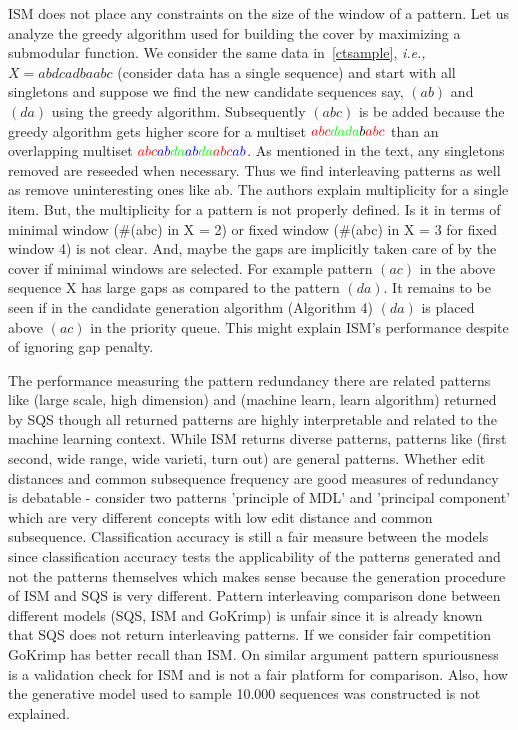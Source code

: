 \documentclass[10pt]{article}
\begin{document}
\par ISM does not place any constraints on the size of the window of a pattern. Let us analyze the greedy algorithm used for building the cover by maximizing a submodular function. We consider the same data in~\ref{ctsample}, \emph{i.e.,} $X=abdcadbaabc$ (consider data has a single sequence) and start with all singletons and suppose we find the new candidate sequences say, {\color{blue}$(ab)$} and {\color{green}$(da)$} using the greedy algorithm. Subsequently {\color{red}$(abc)$} is be added because the greedy algorithm gets higher score for a multiset ${\color{red}abc}{\color{green}da}{\color{green}da}b{\color{red}abc}$ than an overlapping multiset ${\color{red}abc}{\color{blue}ab}{\color{green}da}{\color{blue}ab}{\color{green}da}{\color{red}abc}{\color{blue}ab}$. As mentioned in the text, any singletons removed are reseeded when necessary. Thus we find interleaving patterns as well as remove uninteresting ones like  {\color{blue}ab}. The authors explain multiplicity for a single item. But, the multiplicity for a pattern is not properly defined. Is it in terms of minimal window (\#(abc) in X = 2) or fixed window (\#(abc) in X = 3 for fixed window 4) is not clear. And, maybe the gaps are implicitly taken care of by the cover if minimal windows are selected. For example pattern $(ac)$ in the above sequence X has large gaps as compared to the pattern $(da)$. It remains to be seen if in the candidate generation algorithm (Algorithm 4) $(da)$ is placed above $(ac)$ in the priority queue. This might explain ISM's performance despite of ignoring gap penalty.

\par The performance measuring the pattern redundancy there are related patterns like (large scale, high dimension) and (machine learn, learn algorithm) returned by SQS though all returned patterns are highly interpretable and related to the machine learning context. While ISM returns diverse patterns, patterns like (first second, wide range, wide varieti, turn out) are general patterns. Whether edit distances and common subsequence frequency are good measures of redundancy is debatable - consider two patterns 'principle of MDL' and 'principal component' which are very different concepts with low edit distance and common subsequence. Classification accuracy is still a fair measure between the models since classification accuracy tests the applicability of the patterns generated and not the patterns themselves which makes sense because the generation procedure of ISM and SQS is very different. Pattern interleaving comparison done between different models (SQS, ISM and GoKrimp) is unfair since it is already known that SQS does not return interleaving patterns. If we consider fair competition GoKrimp has better recall than ISM. On similar argument pattern spuriousness is a validation check for ISM and is not a fair platform for comparison. Also, how the generative model used to sample 10.000 sequences was constructed is not explained.
\end{document}
